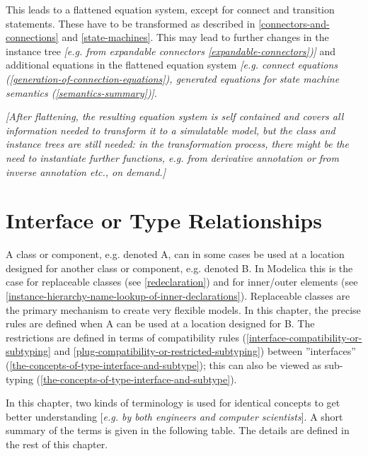 \documentclass[10pt,a4paper]{report}
\def\doublelabel#1{\label{#1}}
\begin{document}
This leads to a flattened equation system, except for connect and
transition statements. These have to be transformed as described in
\ref{connectors-and-connections} and \ref{state-machines}. This may lead to further changes in the
instance tree \emph{{[}e.g. from expandable connectors \ref{expandable-connectors}){]}} 
and additional equations in the flattened equation
system \emph{{[}e.g. connect equations (\ref{generation-of-connection-equations}), generated
equations for state machine semantics (\ref{semantics-summary}){]}}.

\emph{{[}After flattening, the resulting equation system is self
contained and covers all information needed to transform it to a
simulatable model, but the class and instance trees are still needed: in
the transformation process, there might be the need to instantiate
further functions, e.g. from derivative annotation or from inverse
annotation etc., on demand.{]}}

\chapter{Interface or Type Relationships}\doublelabel{interface-or-type-relationships}

A class or component, e.g. denoted A, can in some cases be used at a
location designed for another class or component, e.g. denoted B. In
Modelica this is the case for replaceable classes (see \ref{redeclaration}) and
for inner/outer elements (see \ref{instance-hierarchy-name-lookup-of-inner-declarations}). 
Replaceable classes are the
primary mechanism to create very flexible models. In this chapter, the
precise rules are defined when A can be used at a location designed for
B. The restrictions are defined in terms of compatibility rules
(\ref{interface-compatibility-or-subtyping} and \ref{plug-compatibility-or-restricted-subtyping}) between ''interfaces'' (\ref{the-concepts-of-type-interface-and-subtype}); this can
also be viewed as sub-typing (\ref{the-concepts-of-type-interface-and-subtype}).

In this chapter, two kinds of terminology is used for identical concepts
to get better understanding {[}\emph{e.g. by both engineers and computer
scientists}{]}. A short summary of the terms is given in the following
table. The details are defined in the rest of this chapter.
\end{document}
